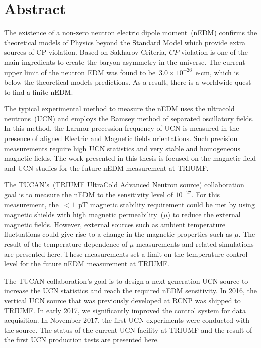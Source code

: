 \documentclass[12pt,a4paper]{book}
\begin{document}
\renewcommand{\thepage}{\roman{page}}
\chapter*{Abstract}
The existence of a non-zero neutron electric dipole moment~(nEDM)
confirms the theoretical models of Physics beyond the Standard Model
which provide extra sources of CP violation. Based on Sakharov
Criteria, $CP$ violation is one of the main ingredients to create the
baryon asymmetry in the universe. The current upper limit of the
neutron EDM was found to be~$3.0 \times 10^{-26}$~e$\cdot$cm, which is
below the theoretical models predictions. As a result, there is a
worldwide quest to find a finite nEDM.

The typical experimental method to measure the nEDM uses the ultracold
neutrons~(UCN) and employs the Ramsey method of separated oscillatory
fields. In this method, the Larmor precession frequency of UCN is
measured in the presence of aligned Electric and Magnetic fields
orientations. Such precision measurements require high UCN statistics
and very stable and homogeneous magnetic fields.  The work presented
in this thesis is focused on the magnetic field and UCN studies for
the future nEDM measurement at TRIUMF.

The TUCAN's~(TRIUMF UltraCold Advanced Neutron source) collaboration
goal is to measure the nEDM to the sensitivity level of
$10^{-27}$. For this measurement, the~$<1$~pT magnetic stability
requirement could be met by using magnetic shields with high magnetic
permeability~($\mu$) to reduce the external magnetic fields. However,
external sources such as ambient temperature fluctuations could give
rise to a change in the magnetic properties such as $\mu$. The result
of the temperature dependence of $\mu$ measurements and related
simulations are presented here.
These measurements set a limit on the temperature control level for
the future nEDM measurement at TRIUMF.

The TUCAN collaboration's goal is to design a next-generation UCN
source to increase the UCN statistics and reach the required nEDM
sensitivity. In 2016, the vertical UCN source that was previously
developed at RCNP was shipped to TRIUMF. In early 2017, we
significantly improved the control system for data acquisition. In
November 2017, the first UCN experiments were conducted with the
source. The status of the current UCN facility at TRIUMF and the
result of the first UCN production tests are presented here.
\end{document}
